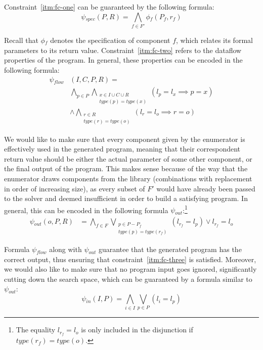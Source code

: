 Constraint~\ref{itm:fc-one} can be guaranteed by the following formula:
%
\[
  \psi{}_{spec}(P, R) = \bigwedge_{f \in F'} \phi{}_f (P_f, r_f)
\]

\noindent
Recall that $\phi{}_f$ denotes the specification of component $f$, which relates
its formal parameters to its return value.
Constraint~\ref{itm:fc-two} refers to
the dataflow properties of the program.
In general, these properties can be encoded in the
following formula:
%
\begin{align*}
  \psi{}_{flow}&(I, C, P, R) =\\
    &\bigwedge_{p \in P}
    \bigwedge_{\substack{x \in I \cup C \cup R \\ type(p) = type(x)}} 
    (l_p = l_x \implies p = x)\\
    &\wedge \bigwedge_{\substack{r \in R \\ type(r) = type(o)}}
    (l_r = l_o \implies r = o)
\end{align*}

\noindent
We would like to make sure that every component given by the enumerator is
effectively used in the generated program, meaning that their correspondent
return value should be either the actual parameter of some other component, or
the final output of the program. This makes sense because of the way that the
enumerator draws components from the library (combinations with replacement in
order of increasing size), as every subset of $F'$ would have already been
passed to the solver and deemed insufficient in order to build a satisfying
program. In general, this can be encoded in the following formula
$\psi{}_{out}$:\footnote{The equality $l_{r_f} = l_o$ is only included in the
  disjunction if $type(r_f) = type(o)$.}
%
\begin{align*}
  \psi{}_{out}(o, P, R) &=
  \bigwedge_{f \in F}
  \bigvee_{\substack{p \in P - P_f \\ type(p) = type(r_f)}}(l_{r_f} = l_p)
  \vee l_{r_f} = l_o
\end{align*}

\noindent
Formula $\psi{}_{flow}$ along with $\psi{}_{out}$ guarantee that the generated
program has the correct output, thus ensuring that constraint~\ref{itm:fc-three}
is satisfied. Moreover, we would also like to make sure that no program input
goes ignored, significantly cutting down the search space, which can be
guaranteed by a formula similar to $\psi{}_{out}$:
%
\[
  \psi{}_{in}(I, P) = \bigwedge_{i \in I}\bigvee_{p \in P}(l_i = l_p)
\]


